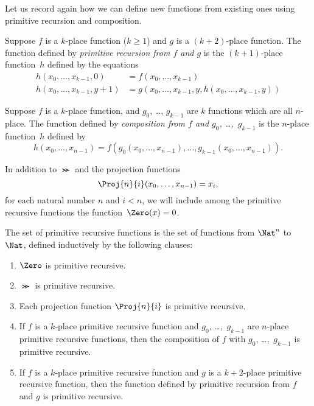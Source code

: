 \documentclass[../../../include/open-logic-section]{subfiles}
\begin{document}

Let us record again how we can define new functions from existing ones
using primitive recursion and composition.

\begin{defn}
   Suppose $f$ is a $k$-place
  function ($k\ge 1$) and $g$ is a $(k+2)$-place function. The
  function defined by \emph{primitive recursion from $f$ and $g$} is
  the $(k+1)$-place function~$h$ defined by the equations
  \begin{align*}
    h(x_0,\dots,x_{k-1},0) & =  f(x_0,\dots,x_{k-1}) \\
    h(x_0,\dots,x_{k-1},y+1) & = g(x_0,\dots,x_{k-1}, y, h(x_0,\dots,x_{k-1}, y))
  \end{align*}
\end{defn}

\begin{defn}
   Suppose $f$ is a $k$-place function, and
  $g_0$, \dots, $g_{k-1}$ are $k$ functions which are all
  $n$-place. The function defined by \emph{composition from $f$ and
    $g_0$, \dots,~$g_{k-1}$} is the $n$-place function~$h$ defined by
  \[
  h(x_0, \dots, x_{n-1}) =
  f(g_0(x_0, \dots, x_{n-1}), \dots, g_{k-1}(x_0, \dots, x_{n-1})).
  \]
\end{defn}

In addition to $\Succ$ and the projection functions
\[
\Proj{n}{i}(x_0,\dots,x_{n-1}) = x_i,
\]
for each natural number $n$ and $i < n$, we will include among the
primitive recursive functions the function~$\Zero(x) = 0$.

\begin{defn}
  The set of primitive recursive functions is the set of functions 
  from $\Nat^n$ to $\Nat$, defined inductively by the
  following clauses:
  \begin{enumerate}
  \item $\Zero$ is primitive recursive.
  \item $\Succ$ is primitive recursive.
  \item Each projection function $\Proj{n}{i}$ is primitive recursive.
  \item If $f$ is a $k$-place primitive recursive function and $g_0$,
    \dots,~$g_{k-1}$ are $n$-place primitive recursive functions, then
    the composition of $f$ with $g_0$, \dots,~$g_{k-1}$ is primitive
    recursive.
  \item If $f$ is a $k$-place primitive recursive function and $g$ is
    a $k+2$-place primitive recursive function, then the function
    defined by primitive recursion from $f$ and $g$ is primitive
    recursive.
\end{enumerate}
\end{defn}
\end{document}
